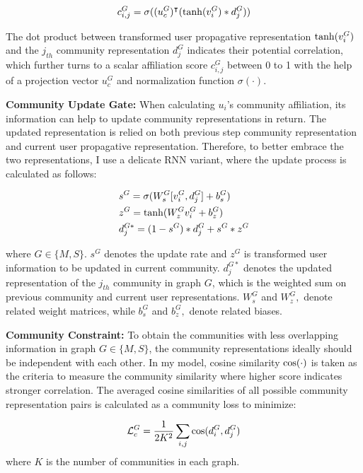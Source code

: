 \begin{equation}\label{eq:dg}
c_{i,j}^G = {\rm  \sigma}((u_{c}^{G})^{\intercal}({\rm  tanh}(v_{i}^{G})*d_j^G))
\end{equation}

The dot product between transformed user propagative representation ${\rm  tanh}(v_{i}^{G})$ and the $j_{th}$ community representation $ d_j^G$ indicates their potential correlation, which further  turns to a scalar affiliation score $c_{i,j}^G$ between 0 to 1 with the help of a projection vector $u_{c}^{G}$ and normalization function $\sigma(\cdot)$.

\textbf{Community Update Gate: } \label{sc:cug} When calculating $u_i$'s community affiliation, its information can help to update community representations in return. The updated representation is relied on both previous step community representation and current user propagative representation. Therefore, to better embrace the two representations, I use a delicate RNN variant, where the update process is calculated as follows:

\begin{equation}\label{eq:up}
\begin{aligned}
&  s^G = \sigma(W_s^G[v_i^{G},d_j^{G}] + b_s^G) \\
& z^G = {\rm tanh}(W_z^Gv_i^G+b_z^G)\\
& d_j^{G*} = (1-s^G)*d_j^{G} + s^G*z^G
\end{aligned}
\end{equation}

where $G \in \{M,S\}$. $s^G$ denotes the update rate and $z^G$ is transformed user information to be updated in current community.  $d_j^{G*}$ denotes the updated representation of the $j_{th}$ community in graph $G$, which is the weighted sum on previous community and current user representations. $W_s^G$ and $W_z^G,$ denote related weight matrices, while $b_s^G$ and $b_z^G,$ denote related biases. 

\textbf{Community Constraint: }
To obtain the communities with less overlapping information in graph $G \in \{M,S\}$, the community representations ideally should be independent with each other. In my model, cosine similarity ${\rm cos}(\cdot)$ is taken as the criteria to measure the community similarity where higher score indicates stronger correlation. The averaged cosine similarities of all possible community representation pairs is calculated as a community loss to minimize:

\begin{equation}\label{eq:cc}
\mathcal{L}_{c}^{G} = \frac{1}{2K^2}\sum_{i,j}{\rm cos}(d_i^{G},d_j^{G})
\end{equation}
where $K$ is the number of communities in each graph.

